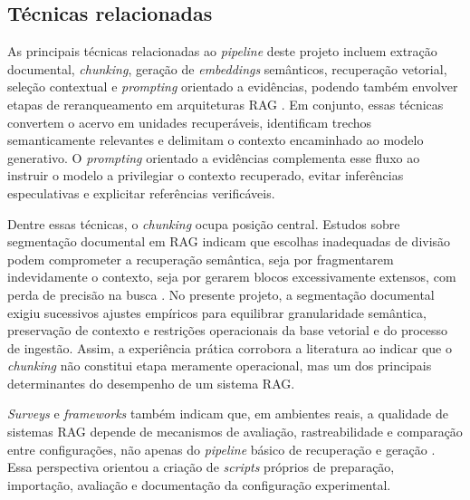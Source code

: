 \subsection{Técnicas relacionadas}

As principais técnicas relacionadas ao \textit{pipeline} deste projeto incluem extração documental, \textit{chunking}, geração de \textit{embeddings} semânticos, recuperação vetorial, seleção contextual e \textit{prompting} orientado a evidências, podendo também envolver etapas de reranqueamento em arquiteturas RAG \parencite{gao2023ragSurvey,maharjan2026chunkingReranking,wangEtAl2025segmentation}. Em conjunto, essas técnicas convertem o acervo em unidades recuperáveis, identificam trechos semanticamente relevantes e delimitam o contexto encaminhado ao modelo generativo. O \textit{prompting} orientado a evidências complementa esse fluxo ao instruir o modelo a privilegiar o contexto recuperado, evitar inferências especulativas e explicitar referências verificáveis.

Dentre essas técnicas, o \textit{chunking} ocupa posição central. Estudos sobre segmentação documental em RAG indicam que escolhas inadequadas de divisão podem comprometer a recuperação semântica, seja por fragmentarem indevidamente o contexto, seja por gerarem blocos excessivamente extensos, com perda de precisão na busca \parencite{wangEtAl2025segmentation,bhatEtAl2025chunkSize}. No presente projeto, a segmentação documental exigiu sucessivos ajustes empíricos para equilibrar granularidade semântica, preservação de contexto e restrições operacionais da base vetorial e do processo de ingestão. Assim, a experiência prática corrobora a literatura ao indicar que o \textit{chunking} não constitui etapa meramente operacional, mas um dos principais determinantes do desempenho de um sistema RAG.

\textit{Surveys} e \textit{frameworks} também indicam que, em ambientes reais, a qualidade de sistemas RAG depende de mecanismos de avaliação, rastreabilidade e comparação entre configurações, não apenas do \textit{pipeline} básico de recuperação e geração \parencite{gao2023ragSurvey,saadFalconEtAl2024ares,esEtAl2023ragas}. Essa perspectiva orientou a criação de \textit{scripts} próprios de preparação, importação, avaliação e documentação da configuração experimental.


